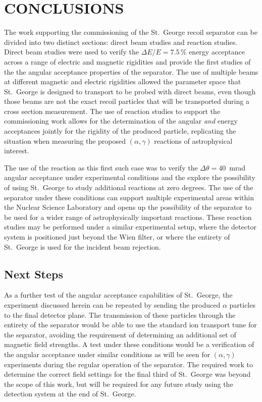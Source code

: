
\chapter{CONCLUSIONS}
\label{ch:conclusions}

The work supporting the commissioning of the St.\ George recoil
separator can be divided into two distinct sections: direct beam studies
and reaction studies. Direct beam studies were used to verify the
$\Delta E/E = 7.5$\,\% energy acceptance across a range of electric and
magnetic rigidities and provide the first studies of the the angular
acceptance properties of the separator. The use of multiple beams at
different magnetic and electric rigidities allowed the parameter space
that St.\ George is designed to transport to be probed with direct
beams, even though those beams are not the exact recoil particles that
will be transported during a cross section measurement. The use of
reaction studies to support the commissioning work allows for the
determination of the angular \textit{and} energy acceptances jointly for
the rigidity of the produced particle, replicating the situation when
measuring the proposed $(\alpha,\gamma)$ reactions of astrophysical
interest.

The use of the \alpa{} reaction as this first such case was to verify
the $\Delta\theta = 40$~mrad angular acceptance under experimental
conditions and the explore the possibility of using St.\ George to
study additional reactions at zero degrees. The use of the separator
under these conditions can support multiple experimental areas within
the Nuclear Science Laboratory and opens up the possibility of the
separator to be used for a wider range of astrophysically important
reactions. These reaction studies may be performed under a similar
experimental setup, where the detector system is positioned just beyond
the Wien filter, or where the entirety of St.\ George is used for the
incident beam rejection.

\section{Next Steps}
\label{sec:next-steps}

As a further test of the angular acceptance capabilities of St.\ George,
the experiment discussed herein can be repeated by sending the produced
$\alpha$ particles to the final detector plane. The transmission of
these particles through the entirety of the separator would be able to
use the standard ion transport tune for the separator, avoiding the
requirement of determining an additional set of magnetic field
strengths. A test under these conditions would be a verification of the
angular acceptance under similar conditions as will be seen for
$(\alpha,\gamma)$ experiments during the regular operation of the
separator. The required work to determine the correct field settings for
the final third of St.\ George was beyond the scope of this work, but
will be required for any future study using the detection system at the
end of St.\ George.

